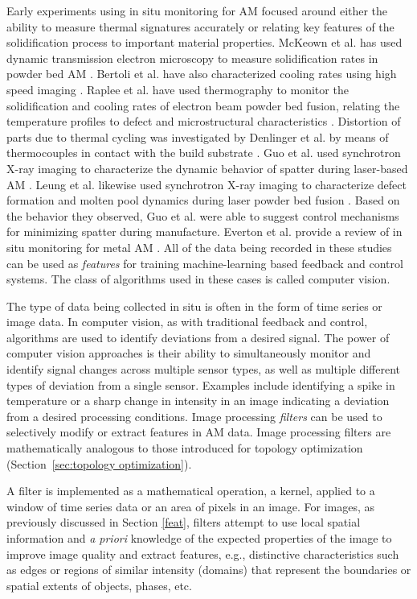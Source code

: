 Early experiments using in situ monitoring for AM focused around either the ability to measure thermal signatures accurately or relating key features of the solidification process to important material properties. McKeown et al. has used dynamic transmission electron microscopy to measure solidification rates in powder bed AM \cite{McKeown2016}. Bertoli et al. have also characterized cooling rates using high speed imaging \cite{Bertoli2017}. Raplee et al. have used thermography to monitor the solidification and cooling rates of electron beam powder bed fusion, relating the temperature profiles to defect and microstructural characteristics \cite{Raplee2017}. Distortion of parts due to thermal cycling was investigated by Denlinger et al. by means of thermocouples in contact with the build substrate \cite{Denlinger2015}. Guo et al. used synchrotron X-ray imaging to characterize the dynamic behavior of spatter during laser-based AM \cite{Guo2018}. Leung et al. likewise used synchrotron X-ray imaging to characterize defect formation and molten pool dynamics during laser powder bed fusion \cite{Leung2018}. Based on the behavior they observed, Guo et al. were able to suggest control mechanisms for minimizing spatter during manufacture. Everton et al. provide a review of in situ monitoring for metal AM \cite{Everton2016}. All of the data being recorded in these studies can be used as \textit{features} for training machine-learning based feedback and control systems. The class of algorithms used in these cases is called computer vision.

The type of data being collected in situ is often in the form of time series or image data. In computer vision, as with traditional feedback and control, algorithms are used to identify deviations from a desired signal. The power of computer vision approaches is their ability to simultaneously monitor and identify signal changes across multiple sensor types, as well as multiple different types of deviation from a single sensor. Examples include identifying a spike in temperature or a sharp change in intensity in an image indicating a deviation from a desired processing conditions. Image processing \textit{filters} can be used to selectively modify or extract features in AM data. Image processing filters are mathematically analogous to those introduced for topology optimization (Section~\ref{sec:topology optimization}). 

A filter is implemented as a mathematical operation, a kernel, applied to a window of time series data or an area of pixels in an image. For images, as previously discussed in Section \ref{feat}, filters attempt to use local spatial information and \textit{a priori} knowledge of the expected properties of the image to improve image quality and extract features, e.g., distinctive characteristics such as edges or regions of similar intensity (domains) that represent the boundaries or spatial extents of objects, phases, etc.

